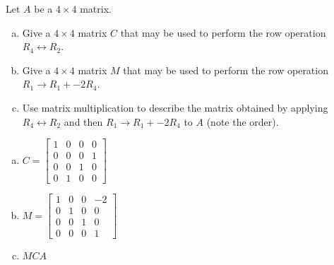 
\begin{exerciseStatement}


Let \(A\) be a \(4 \times 4\) matrix.


\begin{enumerate}[(a)]
\item Give a \(4 \times 4\) matrix \(C\) that may be used to perform the row operation \( R_4 \leftrightarrow R_2 \).
\item Give a \(4 \times 4\) matrix \(M\) that may be used to perform the row operation \( R_1 \to R_1 + -2R_4 \).
\item Use matrix multiplication to describe the matrix obtained by applying \( R_4 \leftrightarrow R_2 \) and then \( R_1 \to R_1 + -2R_4 \) to \(A\) (note the order). 
\end{enumerate}
    
\end{exerciseStatement}
    
\begin{exerciseAnswer} 

\begin{enumerate}[(a)]
\item \(C= \left[\begin{array}{cccc}
1 & 0 & 0 & 0 \\
0 & 0 & 0 & 1 \\
0 & 0 & 1 & 0 \\
0 & 1 & 0 & 0
\end{array}\right] \)
\item \(M= \left[\begin{array}{cccc}
1 & 0 & 0 & -2 \\
0 & 1 & 0 & 0 \\
0 & 0 & 1 & 0 \\
0 & 0 & 0 & 1
\end{array}\right] \)
\item \(MCA\)
\end{enumerate}
    
\end{exerciseAnswer}
    
